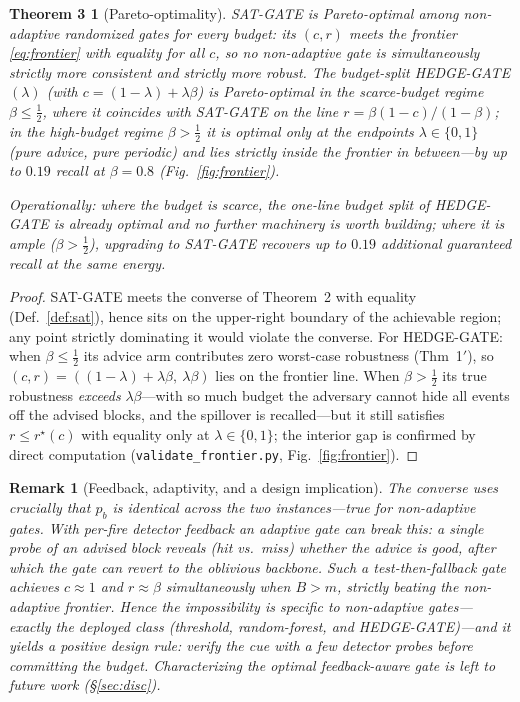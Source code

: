 ﻿\documentclass[lettersize,journal]{IEEEtran}
\newtheorem*{thmthree}{Theorem 3}
\newtheorem*{rem}{Remark}
\begin{document}
\begin{thmthree}[Pareto-optimality]
\textsc{SAT-GATE} is Pareto-optimal among non-adaptive randomized gates for \emph{every} budget: its $(c,r)$ meets the frontier \eqref{eq:frontier} with equality for all $c$, so no non-adaptive gate is simultaneously strictly more consistent and strictly more robust. The budget-split \textsc{HEDGE-GATE}$(\lambda)$ (with $c=(1-\lambda)+\lambda\beta$) is Pareto-optimal in the scarce-budget regime $\beta\le\tfrac12$, where it \emph{coincides} with \textsc{SAT-GATE} on the line $r=\beta(1-c)/(1-\beta)$; in the high-budget regime $\beta>\tfrac12$ it is optimal only at the endpoints $\lambda\in\{0,1\}$ (pure advice, pure periodic) and lies strictly inside the frontier in between---by up to $0.19$ recall at $\beta{=}0.8$ (Fig.~\ref{fig:frontier}).
\end{thmthree}
\noindent\emph{Operationally: where the budget is scarce, the one-line budget split of \textsc{HEDGE-GATE} is already optimal and no further machinery is worth building; where it is ample ($\beta>\tfrac12$), upgrading to \textsc{SAT-GATE} recovers up to $0.19$ additional guaranteed recall at the same energy.}
\begin{proof}
\textsc{SAT-GATE} meets the converse of Theorem~2 with equality (Def.~\ref{def:sat}), hence sits on the upper-right boundary of the achievable region; any point strictly dominating it would violate the converse. For \textsc{HEDGE-GATE}: when $\beta\le\tfrac12$ its advice arm contributes zero worst-case robustness (Thm~1$'$), so $(c,r)=((1-\lambda)+\lambda\beta,\ \lambda\beta)$ lies on the frontier line. When $\beta>\tfrac12$ its true robustness \emph{exceeds} $\lambda\beta$---with so much budget the adversary cannot hide all events off the advised blocks, and the spillover is recalled---but it still satisfies $r\le r^\star(c)$ with equality only at $\lambda\in\{0,1\}$; the interior gap is confirmed by direct computation (\texttt{validate\_frontier.py}, Fig.~\ref{fig:frontier}).
\end{proof}

\begin{rem}[Feedback, adaptivity, and a design implication]\label{rem:feedback}
The converse uses crucially that $p_b$ is identical across the two instances---true for non-adaptive gates. With per-fire detector feedback an \emph{adaptive} gate can break this: a single probe of an advised block reveals (hit vs.\ miss) whether the advice is good, after which the gate can revert to the oblivious backbone. Such a \emph{test-then-fallback} gate achieves $c\approx1$ \emph{and} $r\approx\beta$ simultaneously when $B>m$, strictly beating the non-adaptive frontier. Hence the impossibility is specific to non-adaptive gates---exactly the deployed class (threshold, random-forest, and HEDGE-GATE)---and it yields a positive design rule: \emph{verify the cue with a few detector probes before committing the budget}. Characterizing the optimal feedback-aware gate is left to future work (\S\ref{sec:disc}).
\end{rem}
\end{document}
